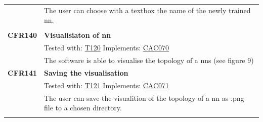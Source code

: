 \documentclass[parskip=full]{scrartcl}
\begin{document}
\begin{tabular}{p{2cm}p{11.4cm}}
& The user can choose with a textbox the name of the newly trained \gls{nn}.\\
& \\
\textbf {CFR140} \hypertarget{CFR140} & \textbf{Visualisiaton of \gls{nn}} \\
& Tested with: \hyperlink{T120}{T120} Implements: \hyperlink{CAC070}{CAC070} \\
& The software is able to visualise the topology of a \glspl{nn} (see figure 9) \\
\textbf{CFR141} \hypertarget{CFR141} & \textbf{Saving the visualisation}\\
& Tested with: \hyperlink{T121}{T121} Implements: \hyperlink{CAC071}{CAC071} \\
& The user can save the visualition of the topology of a \gls{nn} as .png file to a chosen directory.\\
& \\
\end{tabular}
\newpage
\end{document}
